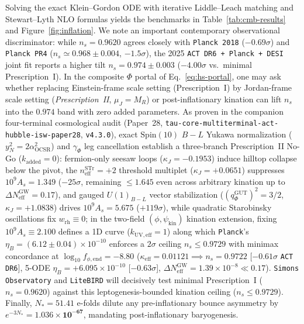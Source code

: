 \documentclass[11pt,a4paper]{article}
\begin{document}
Solving the exact Klein--Gordon ODE with iterative Liddle--Leach matching \cite{LiddleLeach2003} and Stewart--Lyth NLO formulas \cite{StewartLyth1993} yields the benchmarks in Table~\ref{tab:cmb-results} and Figure~\ref{fig:inflation}. We note an important contemporary observational discriminator: while $n_s = 0.9620$ agrees closely with \texttt{Planck 2018} ($-0.69\sigma$) and \texttt{Planck PR4} ($n_s \simeq 0.968 \pm 0.004$, $-1.5\sigma$), the 2025 \texttt{ACT DR6 + Planck + DESI} joint fit reports a higher tilt $n_s = 0.974 \pm 0.003$ \cite{ACTDR6_2025} ($-4.00\sigma$ vs.\ minimal Prescription~I). In the composite $\Phi$ portal of Eq.~\eqref{eq:hs-portal}, one may ask whether replacing Einstein-frame scale setting (Prescription~I) by Jordan-frame scale setting (\emph{Prescription~II}, $\mu_J = M_R$) or post-inflationary kination can lift $n_s$ into the $0.974$ band with zero added parameters. As proven in the companion four-terminal cosmological audit (Paper~28, \texttt{tau-core-multiterminal-act-hubble-isw-paper28}, \texttt{v4.3.0}), exact $\mathrm{Spin}(10)$ $B-L$ Yukawa normalization ($y_N^2 = 2\alpha_{\mathrm{OCSR}}^2$) and $\gamma_\Phi$ leg cancellation establish a three-branch Prescription~II No-Go ($k_{\mathrm{added}} = 0$): fermion-only seesaw loops ($\kappa_J = -0.1953$) induce hilltop collapse below the pivot, the $n_{\mathrm{eff}}^{\mathrm{STr}} = +2$ threshold multiplet ($\kappa_J = +0.0651$) suppresses $10^9 A_s = 1.349$ ($-25\sigma$, remaining $\le 1.645$ even across arbitrary kination up to $\Delta N_{\mathrm{eff}}^{\mathrm{GW}} = 0.17$), and gauged $U(1)_{B-L}$ vector stabilization ($(q_\Phi^{\mathrm{GUT}})^2 = 3/2$, $\kappa_J = +1.0838$) drives $10^9 A_s = 5.675$ ($+119\sigma$), while quadratic Starobinsky oscillations fix $w_{\mathrm{rh}} \equiv 0$; in the two-field $(\phi,\psi_{\mathrm{kin}})$ kination extension, fixing $10^9 A_s \equiv 2.100$ defines a 1D curve ($k_{\mathrm{UV,eff}} = 1$) along which \texttt{Planck}'s $\eta_B = (6.12 \pm 0.04)\times 10^{-10}$ enforces a $2\sigma$ ceiling $n_s \le 0.9729$ with minimax concordance at $\log_{10} f_{\phi,\mathrm{end}} = -8.80$ ($\kappa_{\mathrm{eff}} = 0.01121 \implies n_s = 0.9722$ [$-0.61\sigma$ \texttt{ACT DR6}], 5-ODE $\eta_B = +6.095\times 10^{-10}$ [$-0.63\sigma$], $\Delta N_{\mathrm{eff}}^{\mathrm{GW}} = 1.39\times 10^{-8} \ll 0.17$). \texttt{Simons Observatory} and \texttt{LiteBIRD} will decisively test minimal Prescription~I ($n_s = 0.9620$) against this leptogenesis-bounded kination ceiling ($n_s \le 0.9729$). Finally, $N_* = 51.41$ e-folds dilute any pre-inflationary bounce asymmetry by $e^{-3N_*} = \mathbf{1.036\times 10^{-67}}$, mandating post-inflationary baryogenesis.
\end{document}
